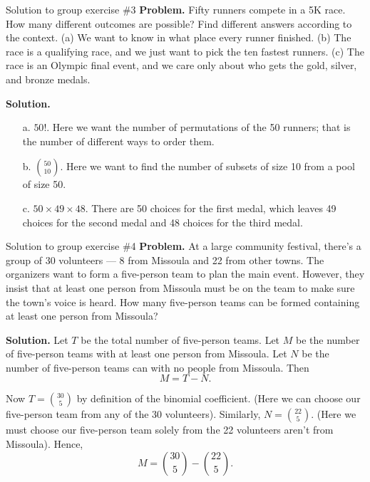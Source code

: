 \documentclass[10pt]{beamer}
\begin{document}
\begin{frame}{Solution to group exercise \#3}
\textbf{Problem.}
Fifty runners compete in a 5K race.  How many different outcomes are possible? Find different answers according to the context. (a) We want to know in what place every runner finished.  (b) The race is a qualifying race, and we just want to pick the ten fastest runners. (c) The race is an Olympic final event, and we care only about who gets the gold, silver, and bronze medals.

\vfill 
\textbf{Solution.}
\begin{itemize}
\item[a.] $50!$. Here we want the number of permutations of the 50 runners; that is the number of different ways to order them. 
\item[b.] $\binom{50}{10}$. Here we want to find the number of subsets of size 10 from a pool of size 50.
\item[c.] $50 \times 49 \times 48$. There are 50 choices for the first medal, which leaves 49 choices for the second medal and 48 choices for the third medal. 
\end{itemize}
\end{frame}


\begin{frame}{Solution to group exercise \#4}
\small 
\textbf{Problem.}
At a large community festival, there’s a group of 30 volunteers — 8 from Missoula and 22 from other towns. The organizers want to form a five-person team to plan the main event. However, they insist that at least one person from Missoula must be on the team to make sure the town’s voice is heard. How many five-person teams can be formed containing at least one person from Missoula?

\vfill 
\textbf{Solution.}  Let $T$ be the total number of five-person teams.  Let $M$ be the number of five-person teams with at least one person from Missoula.   Let $N$ be the number of five-person teams can with no people from Missoula.  Then
\[ M = T - N. \]

Now $T=\binom{30}{5}$ by definition of the binomial coefficient. (Here we can choose our five-person team from any of the 30 volunteers). Similarly,  $N=\binom{22}{5}$. (Here we must choose our five-person team solely from the 22 volunteers aren't from Missoula). Hence,
\[M = \binom{30}{5} - \binom{22}{5}. \] 


\end{frame}
\end{document}
